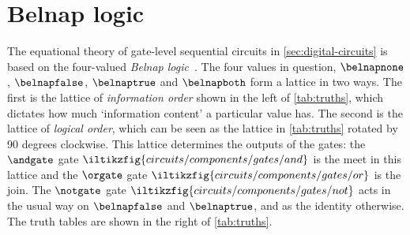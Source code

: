 \section{Belnap logic}
\label{app:belnap}

The equational theory of gate-level sequential circuits in
\cref{sec:digital-circuits} is based on the four-valued
\emph{Belnap logic}~\cite{belnap1977useful}.
The four values in question, \(\belnapnone\), \(\belnapfalse\), \(\belnaptrue\)
and \(\belnapboth\) form a lattice in two ways.
The first is the lattice of \emph{information order} shown in the left of
\cref{tab:truths}, which dictates how much `information content' a particular value
has.
The second is the lattice of \emph{logical order}, which can be seen as the
lattice in \cref{tab:truths} rotated by 90 degrees clockwise.
This lattice determines the outputs of the gates: the \(\andgate\) gate \(
    \iltikzfig{circuits/components/gates/and}
\) is the meet in this lattice and the \(\orgate\) gate \(
    \iltikzfig{circuits/components/gates/or}
\) is the join.
The \(\notgate\) gate \(
    \iltikzfig{circuits/components/gates/not}
\) acts in the usual way on \(\belnapfalse\) and \(\belnaptrue\), and as the
identity otherwise.
The truth tables are shown in the right of \cref{tab:truths}.

